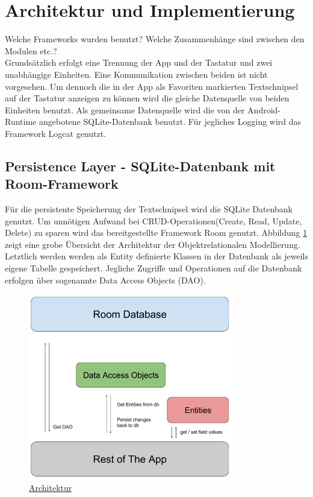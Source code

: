 \documentclass[11pt]{article}
\begin{document}
	
\section{Architektur und Implementierung}
	Welche Frameworks wurden benutzt? Welche Zusammenhänge sind zwischen den Modulen etc.?\\
	Grundsätzlich erfolgt eine Trennung der App und der Tastatur und zwei unabhängige Einheiten.
	Eine Kommunikation zwischen beiden ist nicht vorgesehen.
	Um dennoch die in der App als Favoriten markierten Textschnipsel auf der Tastatur anzeigen zu können wird die gleiche Datenquelle von beiden Einheiten benutzt.
	Als gemeinsame Datenquelle wird die von der Android-Runtime angebotene SQLite-Datenbank benutzt.
	Für jegliches Logging wird das Framework Logcat genutzt.
		
		\subsection{Persistence Layer - SQLite-Datenbank mit Room-Framework}
			Für die persistente Speicherung der Textschnipsel wird die SQLite Datenbank genutzt. 
			Um unnötigen Aufwand bei CRUD-Operationen(Create, Read, Update, Delete) zu sparen wird das  bereitgestellte Framework Room genutzt. \newline
			Abbildung \ref{fig:room_arch} zeigt eine grobe Übersicht der Architektur der Objektrelationalen Modellierung. Letztlich werden werden als Entity definierte Klassen in der Datenbank als jeweils eigene Tabelle gespeichert. Jegliche Zugriffe und Operationen auf die Datenbank erfolgen über sogenannte Data Access Objects (DAO). 
						
			\begin{figure}[H]
				\centering
				\includegraphics[width=0.8\textwidth]{Konzepte/room_architecture.png}
				\caption{\href{https://developer.android.com/training/data-storage/room/}{Architektur}}
				\label{fig:room_arch}
			\end{figure}
		
\end{document}
